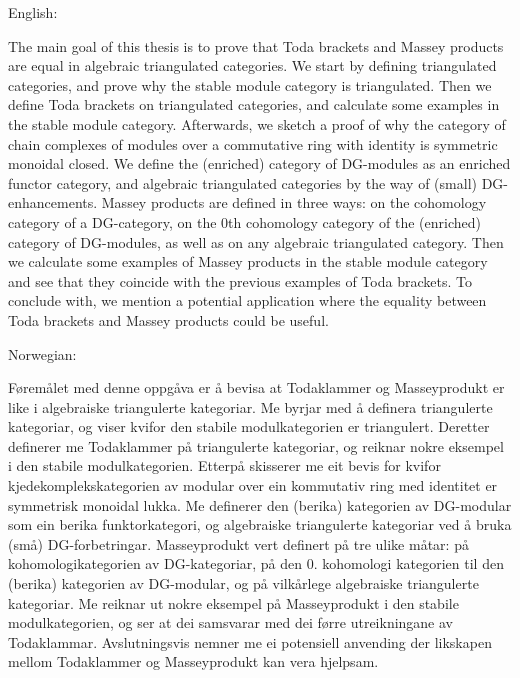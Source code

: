 English:

The main goal of this thesis is to prove that Toda brackets and Massey products are equal in algebraic triangulated categories. We start by defining triangulated categories, and prove why the stable module category is triangulated. Then we define Toda brackets on triangulated categories, and calculate some examples in the stable module category. Afterwards, we sketch a proof of why the category of chain complexes of modules over a commutative ring with identity is symmetric monoidal closed. We define the (enriched) category of DG-modules as an enriched functor category, and algebraic triangulated categories by the way of (small) DG-enhancements. Massey products are defined in three ways: on the cohomology category of a DG-category, on the 0th cohomology category of the (enriched) category of DG-modules, as well as on any algebraic triangulated category. Then we calculate some examples of Massey products in the stable module category and see that they coincide with the previous examples of Toda brackets. To conclude with, we mention a potential application where the equality between Toda brackets and Massey products could be useful.

Norwegian:

Føremålet med denne oppgåva er å bevisa at Todaklammer og Masseyprodukt er like i algebraiske triangulerte kategoriar. Me byrjar med å definera triangulerte kategoriar, og viser kvifor den stabile modulkategorien er triangulert. Deretter definerer me Todaklammer på triangulerte kategoriar, og reiknar nokre eksempel i den stabile modulkategorien. Etterpå skisserer me eit bevis for kvifor kjedekomplekskategorien av modular over ein kommutativ ring med identitet er symmetrisk monoidal lukka. Me definerer den (berika) kategorien av DG-modular som ein berika funktorkategori, og algebraiske triangulerte kategoriar ved å bruka (små) DG-forbetringar. Masseyprodukt vert definert på tre ulike måtar: på kohomologikategorien av DG-kategoriar, på den 0. kohomologi kategorien til den (berika) kategorien av DG-modular, og på vilkårlege algebraiske triangulerte kategoriar. Me reiknar ut nokre eksempel på Masseyprodukt i den stabile modulkategorien, og ser at dei samsvarar med dei førre utreikningane av Todaklammar. Avslutningsvis nemner me ei potensiell anvending der likskapen mellom Todaklammer og Masseyprodukt kan vera hjelpsam.